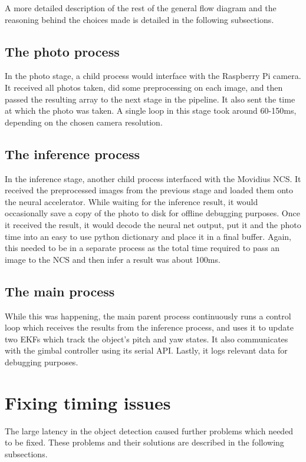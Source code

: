 A more detailed description of the rest of the general flow diagram and the reasoning behind the choices made is detailed in the following subsections.

\subsection{The photo process}
In the photo stage, a child process would interface with the Raspberry Pi camera. It received all photos taken, did some preprocessing on each image, and then passed the resulting array to the next stage in the pipeline. It also sent the time at which the photo was taken. A single loop in this stage took around 60-150ms, depending on the chosen camera resolution.

\subsection{The inference process}
In the inference stage, another child process interfaced with the Movidius NCS. It received the preprocessed images from the previous stage and loaded them onto the neural accelerator. While waiting for the inference result, it would occasionally save a copy of the photo to disk for offline debugging purposes. Once it received the result, it would decode the neural net output, put it and the photo time into an easy to use python dictionary and place it in a final buffer. Again, this needed to be in a separate process as the total time required to pass an image to the NCS and then infer a result was about 100ms.

\subsection{The main process}
While this was happening, the main parent process continuously runs a control loop which receives the results from the inference process, and uses it to update two EKFs which track the object's pitch and yaw states. It also communicates with the gimbal controller using its serial API. Lastly, it logs relevant data for debugging purposes.



\section{Fixing timing issues}
The large latency in the object detection caused further problems which needed to be fixed. These problems and their solutions are described in the following subsections.

